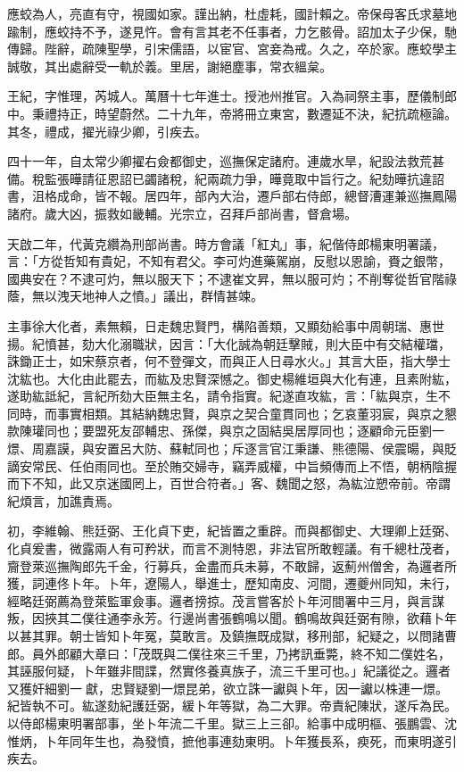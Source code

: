 \begin{pinyinscope}
應蛟為人，亮直有守，視國如家。謹出納，杜虛耗，國計賴之。帝保母客氏求墓地踰制，應蛟持不予，遂見忤。會有言其老不任事者，力乞骸骨。詔加太子少保，馳傳歸。陛辭，疏陳聖學，引宋儒語，以宦官、宮妾為戒。久之，卒於家。應蛟學主誠敬，其出處辭受一軌於義。里居，謝絕塵事，常衣縕枲。

王紀，字惟理，芮城人。萬曆十七年進士。授池州推官。入為祠祭主事，歷儀制郎中。秉禮持正，時望蔚然。二十九年，帝將冊立東宮，數遷延不決，紀抗疏極論。其冬，禮成，擢光祿少卿，引疾去。

四十一年，自太常少卿擢右僉都御史，巡撫保定諸府。連歲水旱，紀設法救荒甚備。稅監張曄請征恩詔已蠲諸稅，紀兩疏力爭，曄竟取中旨行之。紀劾曄抗違詔書，沮格成命，皆不報。居四年，部內大治，遷戶部右侍郎，總督漕運兼巡撫鳳陽諸府。歲大凶，振救如畿輔。光宗立，召拜戶部尚書，督倉場。

天啟二年，代黃克纘為刑部尚書。時方會議「紅丸」事，紀偕侍郎楊東明署議，言：「方從哲知有貴妃，不知有君父。李可灼進藥駕崩，反慰以恩諭，賚之銀幣，國典安在？不逮可灼，無以服天下；不逮崔文昇，無以服可灼；不削奪從哲官階祿蔭，無以洩天地神人之憤。」議出，群情甚竦。

主事徐大化者，素無賴，日走魏忠賢門，構陷善類，又顯劾給事中周朝瑞、惠世揚。紀憤甚，劾大化溺職狀，因言：「大化誠為朝廷擊賊，則大臣中有交結權璫，誅鋤正士，如宋蔡京者，何不登彈文，而與正人日尋水火。」其言大臣，指大學士沈紘也。大化由此罷去，而紘及忠賢深憾之。御史楊維垣與大化有連，且素附紘，遂助紘詆紀，言紀所劾大臣無主名，請令指實。紀遂直攻紘，言：「紘與京，生不同時，而事實相類。其結納魏忠賢，與京之契合童貫同也；乞哀董羽宸，與京之懇款陳瓘同也；要盟死友邵輔忠、孫傑，與京之固結吳居厚同也；逐顧命元臣劉一燝、周嘉謨，與安置呂大防、蘇軾同也；斥逐言官江秉謙、熊德陽、侯震暘，與貶謫安常民、任伯雨同也。至於賄交婦寺，竊弄威權，中旨頻傳而上不悟，朝柄陰握而下不知，此又京迷國罔上，百世合符者。」客、魏聞之怒，為紘泣愬帝前。帝謂紀煩言，加譙責焉。

初，李維翰、熊廷弼、王化貞下吏，紀皆置之重辟。而與都御史、大理卿上廷弼、化貞爰書，微露兩人有可矜狀，而言不測特恩，非法官所敢輕議。有千總杜茂者，齎登萊巡撫陶郎先千金，行募兵，金盡而兵未募，不敢歸，返薊州僧舍，為邏者所獲，詞連佟卜年。卜年，遼陽人，舉進士，歷知南皮、河間，遷夔州同知，未行，經略廷弼薦為登萊監軍僉事。邏者搒掠。茂言嘗客於卜年河間署中三月，與言謀叛，因挾其二僕往通李永芳。行邊尚書張鶴鳴以聞。鶴鳴故與廷弼有隙，欲藉卜年以甚其罪。朝士皆知卜年冤，莫敢言。及鎮撫既成獄，移刑部，紀疑之，以問諸曹郎。員外郎顧大章曰：「茂既與二僕往來三千里，乃拷訊垂斃，終不知二僕姓名，其誣服何疑，卜年雖非間諜，然實佟養真族子，流三千里可也。」紀議從之。邏者又獲奸細劉一獻，忠賢疑劉一燝昆弟，欲立誅一讞與卜年，因一讞以株連一燝。紀皆執不可。紘遂劾紀護廷弼，緩卜年等獄，為二大罪。帝責紀陳狀，遂斥為民。以侍郎楊東明署部事，坐卜年流二千里。獄三上三卻。給事中成明樞、張鵬雲、沈惟炳，卜年同年生也，為發憤，摭他事連劾東明。卜年獲長系，瘐死，而東明遂引疾去。


\end{pinyinscope}
